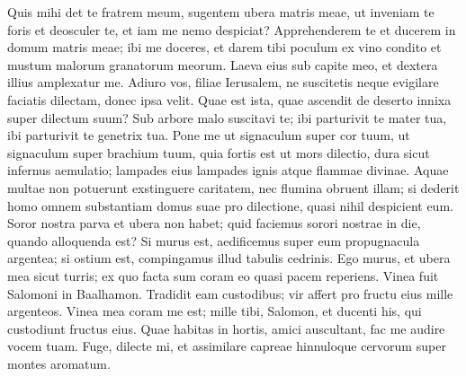 \begin{biblechapter}  
\verse Quis mihi det te fratrem meum, sugentem ubera matris meae, ut inveniam te foris et deosculer te, et iam me nemo despiciat? 
\verse Apprehenderem te et ducerem in domum matris meae; ibi me doceres, et darem tibi poculum ex vino condito et mustum malorum granatorum meorum. 
\verse Laeva eius sub capite meo, et dextera illius amplexatur me. 
\verse Adiuro vos, filiae Ierusalem, ne suscitetis neque evigilare faciatis dilectam, donec ipsa velit. 
\verse Quae est ista, quae ascendit de deserto innixa super dilectum suum? Sub arbore malo suscitavi te; ibi parturivit te mater tua, ibi parturivit te genetrix tua. 
\verse Pone me ut signaculum super cor tuum, ut signaculum super brachium tuum, quia fortis est ut mors dilectio, dura sicut infernus aemulatio; lampades eius lampades ignis atque flammae divinae. 
\verse Aquae multae non potuerunt exstinguere caritatem, nec flumina obruent illam; si dederit homo omnem substantiam domus suae pro dilectione, quasi nihil despicient eum. 
\verse Soror nostra parva et ubera non habet; quid faciemus sorori nostrae in die, quando alloquenda est? 
\verse Si murus est, aedificemus super eum propugnacula argentea; si ostium est, compingamus illud tabulis cedrinis. 
\verse Ego murus, et ubera mea sicut turris; ex quo facta sum coram eo quasi pacem reperiens. 
\verse Vinea fuit Salomoni in Baalhamon. Tradidit eam custodibus; vir affert pro fructu eius mille argenteos. 
\verse Vinea mea coram me est; mille tibi, Salomon, et ducenti his, qui custodiunt fructus eius. 
\verse Quae habitas in hortis, amici auscultant, fac me audire vocem tuam. 
\verse Fuge, dilecte mi, et assimilare capreae hinnuloque cervorum super montes aromatum.
\end{biblechapter}
